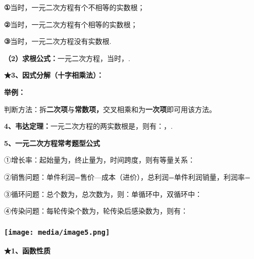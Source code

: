 \documentclass[a4paper,11pt,UTF8]{ctexart}
\begin{document}
\textbf{①}当时，一元二次方程有个不相等的实数根；

\textbf{②}当时，一元二次方程有个相等的实数根；

\textbf{③}当时，一元二次方程没有实数根.

\textbf{（2）求根公式：}一元二次方程，当时，.

\textbf{★3、因式分解（十字相乘法）：}

\textbf{举例：}

判断方法：拆\textbf{二次项}与\textbf{常数项，}交叉相乘和为\textbf{一次项}即可用该方法。

\textbf{4、韦达定理：}一元二次方程的两实数根是，则有：，.

\textbf{5、一元二次方程常考题型公式}

①增长率：起始量为，终止量为，时间跨度，则有等量关系：

②销售问题：单件利润=售价---成本（进价），总利润=单件利润销量，利润率=

③循环问题：总个数为，总次数为，则：单循环中，双循环中：

④传染问题：每轮传染个数为，轮传染后感染数为，则有：

\hypertarget{ux5b66ux79d1ux7f51www.zxxk.com--ux6559ux80b2ux8d44ux6e90ux95e8ux6237ux63d0ux4f9bux8bd5ux9898ux8bd5ux5377ux6559ux6848ux8bfeux4ef6ux6559ux5b66ux8bbaux6587ux7d20ux6750ux7b49ux5404ux7c7bux6559ux5b66ux8d44ux6e90ux5e93ux4e0bux8f7dux8fd8ux6709ux5927ux91cfux4e30ux5bccux7684ux6559ux5b66ux8d44ux8baf-39}{%
\subsubsection{\texorpdfstring{\protect\texttt{[image: media/image5.png]}}{学科网(www.zxxk.com)-\/-教育资源门户，提供试题试卷、教案、课件、教学论文、素材等各类教学资源库下载，还有大量丰富的教学资讯！}}\label{ux5b66ux79d1ux7f51www.zxxk.com--ux6559ux80b2ux8d44ux6e90ux95e8ux6237ux63d0ux4f9bux8bd5ux9898ux8bd5ux5377ux6559ux6848ux8bfeux4ef6ux6559ux5b66ux8bbaux6587ux7d20ux6750ux7b49ux5404ux7c7bux6559ux5b66ux8d44ux6e90ux5e93ux4e0bux8f7dux8fd8ux6709ux5927ux91cfux4e30ux5bccux7684ux6559ux5b66ux8d44ux8baf-39}}

\textbf{★1、函数性质}
\end{document}
